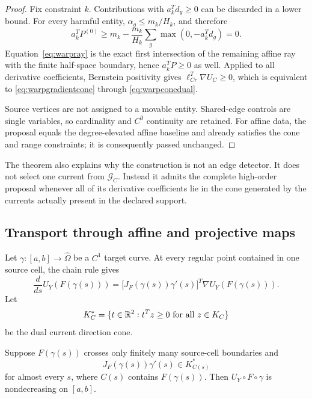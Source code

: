 \begin{proof}
Fix constraint \(k\).  Contributions with \(a_k^Td_g\geq0\) can be
discarded in a lower bound.  For every harmful entity,
\(\alpha_g\leq m_k/H_k\), and therefore
\begin{equation}
 a_k^TP^{(0)}
 \geq m_k-\frac{m_k}{H_k}
       \sum_g\max(0,-a_k^Td_g)
 =0.
 \label{eq:warpcapacityproof}
\end{equation}
Equation~\eqref{eq:warpray} is the exact first intersection of the remaining
affine ray with the finite half-space boundary, hence \(a_k^TP\geq0\) as
well.  Applied to all derivative coefficients, Bernstein positivity gives
\(\ell_{Cr}^T\nabla U_C\geq0\), which is equivalent to
\eqref{eq:warpgradientcone} through \eqref{eq:warpconedual}.

Source vertices are not assigned to a movable entity.  Shared-edge controls
are single variables, so cardinality and \(C^0\) continuity are retained.
For affine data, the proposal equals the degree-elevated affine baseline and
already satisfies the cone and range constraints; it is consequently passed
unchanged.
\end{proof}

The theorem also explains why the construction is not an edge detector.  It
does not select one current from \(\mathcal G_C\).  Instead it admits the
complete high-order proposal whenever all of its derivative coefficients lie
in the cone generated by the currents actually present in the declared
support.

\subsection{Transport through affine and projective maps}

Let \(\gamma:[a,b]\to\widehat\Omega\) be a \(C^1\) target curve.  At every
regular point contained in one source cell, the chain rule gives
\begin{equation}
 \frac{d}{ds}U_Y(F(\gamma(s)))=
 \bigl[J_F(\gamma(s))\gamma'(s)\bigr]^T
 \nabla U_Y(F(\gamma(s))).
 \label{eq:warpchain}
\end{equation}
Let
\begin{equation}
 K_C^*=\{t\in\mathbb{R}^2:t^Tz\geq0\ \text{for all }z\in K_C\}
 \label{eq:warpdual}
\end{equation}
be the dual current direction cone.

\begin{corollary}
Suppose \(F(\gamma(s))\) crosses only finitely many source-cell boundaries
and
\begin{equation}
 J_F(\gamma(s))\gamma'(s)\in K_{C(s)}^*
 \label{eq:warptangentcondition}
\end{equation}
for almost every \(s\), where \(C(s)\) contains \(F(\gamma(s))\).  Then
\(U_Y\circ F\circ\gamma\) is nondecreasing on \([a,b]\).
\end{corollary}

